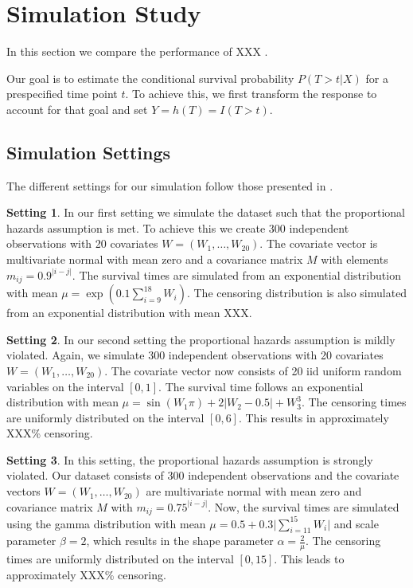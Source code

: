 \documentclass[12pt, a4paper]{article}
\theoremstyle{definition}
\newtheorem{setting}{Setting}
\theoremstyle{plain}
\numberwithin{equation}{section}
\numberwithin{figure}{section}
\numberwithin{table}{section}
\begin{document}
	\newpage

	\section{Simulation Study} \label{simulation}
	In this section we compare the performance of XXX
	.
	
		
	Our goal is to estimate the conditional survival probability $P(T>t\vert X)$ for a prespecified time point $t$.
	To achieve this, we first transform the response to account for that goal and set $Y=h(T)=I(T>t)$.
	
	\subsection{Simulation Settings}

	The different settings for our simulation follow those presented in \citet*{culs}.
	
	\begin{setting}
		In our first setting we simulate the dataset such that the proportional hazards assumption is met.
		To achieve this we create 300 independent observations with 20 covariates $W=(W_1,\dots,W_{20})$.
		The covariate vector is multivariate normal with mean zero and a covariance matrix $M$ with elements $m_{ij}=0.9^{\vert i-j\vert}$.
		The survival times are simulated from an exponential distribution with mean $\mu = \exp\left(0.1\sum_{i=9}^{18}W_i\right)$.
		The censoring distribution is also simulated from an exponential distribution with mean XXX.
	\end{setting}

	\begin{setting}		
		In our second setting the proportional hazards assumption is mildly violated.
		Again, we simulate 300 independent observations with 20 covariates $W=(W_1,\dots, W_{20})$.
		The covariate vector now consists of 20 iid uniform random variables on the interval $[0,1]$.
		The survival time follows an exponential distribution with mean $\mu = \sin(W_1\pi)+2\vert W_2-0.5\vert + W_3^3$.
		The censoring times are uniformly distributed on the interval $[0,6]$.
		This results in approximately XXX\% censoring.
	\end{setting}
		
	\begin{setting}
		In this setting, the proportional hazards assumption is strongly violated.
		Our dataset consists of 300 independent observations and the covariate vectors $W=(W_1,\dots,W_{20})$ are multivariate normal with mean zero and covariance matrix $M$ with $m_{ij}=0.75^{\vert i-j\vert}$.
		Now, the survival times are simulated using the gamma distribution with  mean $\mu = 0.5 + 0.3 \vert \sum_{i=11}^{15} W_i \vert$ and scale parameter $\beta = 2$, which results in the shape parameter $\alpha = \frac{2}{\mu}$.
		The censoring times are uniformly distributed on the interval $[0,15]$.
		This leads to approximately XXX\% censoring.
	\end{setting}
\end{document}
